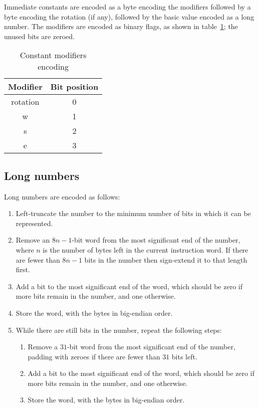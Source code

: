 \documentclass[english]{scrartcl}
\newcommand{\synfont}{\sffamily}
\newcommand{\ctablecaption}{}
\newenvironment{ctable}[3][tbp]%
{\renewcommand{\ctablecaption}{#2}%
  \begin{table}[#1]\begin{center}\begin{tabular}{#3}}%
      {\end{tabular}\caption{\ctablecaption}\end{center}\end{table}}
\begin{document}
Immediate constants are encoded as a byte encoding the modifiers
followed by a byte encoding the rotation (if any), followed by the
basic value encoded as a long number. The modifiers are encoded as
binary flags, as shown in table~\ref{modenctab}; the unused bits are
zeroed.

\begin{ctable}{Constant modifiers encoding\label{modenctab}}{>{\synfont}cc}
  \toprule \bf Modifier & \bf Bit position \\ \midrule
  \textrm{rotation} & 0 \\
  w & 1 \\
  s & 2 \\
  e & 3 \\
  \bottomrule
\end{ctable}


\subsection{Long numbers} \label{longnums}

Long numbers are encoded as follows:

\begin{enumerate}
\item Left-truncate the number to the minimum number of bits in which
  it can be represented.
  
\item Remove an $8n-1$-bit word from the most significant end of the
  number, where $n$ is the number of bytes left in the current
  instruction word. If there are fewer than $8n-1$ bits in the number
  then sign-extend it to that length first.
  
\item Add a bit to the most significant end of the word, which should
  be zero if more bits remain in the number, and one otherwise.
  
\item Store the word, with the bytes in big-endian order.
  
\item While there are still bits in the number, repeat the following
  steps:

  \begin{enumerate}
  \item Remove a $31$-bit word from the most significant end of the
    number, padding with zeroes if there are fewer than $31$ bits left.
    
  \item Add a bit to the most significant end of the word, which should
    be zero if more bits remain in the number, and one otherwise.

  \item Store the word, with the bytes in big-endian order.
  \end{enumerate}

\end{enumerate}
\end{document}

